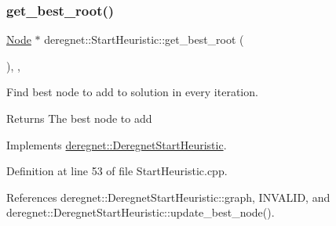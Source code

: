 \subsubsection{\texorpdfstring{get\+\_\+best\+\_\+root()}{get\_best\_root()}}
{\footnotesize\ttfamily \hyperlink{namespacederegnet_a744bad34f2de9856d36715a445f027f3}{Node} $\ast$ deregnet\+::\+Start\+Heuristic\+::get\+\_\+best\+\_\+root (\begin{DoxyParamCaption}{ }\end{DoxyParamCaption})\hspace{0.3cm}{\ttfamily [override]}, {\ttfamily [private]}, {\ttfamily [virtual]}}



Find best node to add to solution in every iteration. 

\begin{DoxyReturn}{Returns}
The best node to add 
\end{DoxyReturn}


Implements \hyperlink{classderegnet_1_1DeregnetStartHeuristic_a372be86d0fb8ac94bd926a1f4d09e102}{deregnet\+::\+Deregnet\+Start\+Heuristic}.



Definition at line 53 of file Start\+Heuristic.\+cpp.



References deregnet\+::\+Deregnet\+Start\+Heuristic\+::graph, I\+N\+V\+A\+L\+ID, and deregnet\+::\+Deregnet\+Start\+Heuristic\+::update\+\_\+best\+\_\+node().


